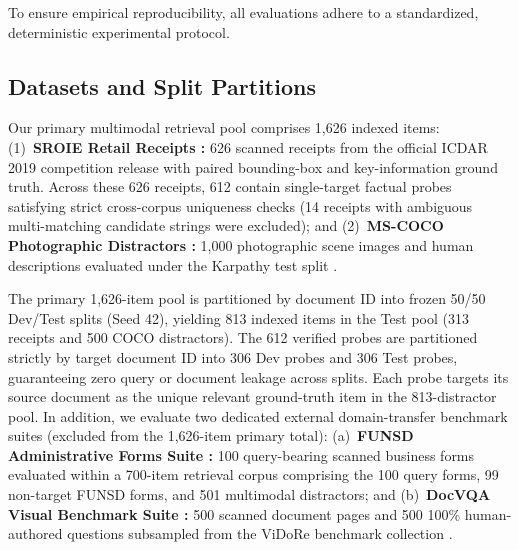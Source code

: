 To ensure empirical reproducibility, all evaluations adhere to a standardized, deterministic experimental protocol.

\subsection{Datasets and Split Partitions}
Our primary multimodal retrieval pool comprises 1,626 indexed items: (1)~\textbf{SROIE Retail Receipts \cite{huang2019sroie}:} 626 scanned receipts from the official ICDAR 2019 competition release with paired bounding-box and key-information ground truth. Across these 626 receipts, 612 contain single-target factual probes satisfying strict cross-corpus uniqueness checks (14 receipts with ambiguous multi-matching candidate strings were excluded); and (2)~\textbf{MS-COCO Photographic Distractors \cite{lin2014coco}:} 1,000 photographic scene images and human descriptions evaluated under the Karpathy test split \cite{karpathy2015deep}.

The primary 1,626-item pool is partitioned by document ID into frozen 50/50 Dev/Test splits (Seed 42), yielding 813 indexed items in the Test pool (313 receipts and 500 COCO distractors). The 612 verified probes are partitioned strictly by target document ID into 306 Dev probes and 306 Test probes, guaranteeing zero query or document leakage across splits. Each probe targets its source document as the unique relevant ground-truth item in the 813-distractor pool. In addition, we evaluate two dedicated external domain-transfer benchmark suites (excluded from the 1,626-item primary total): (a)~\textbf{FUNSD Administrative Forms Suite \cite{jaume2019funsd}:} 100 query-bearing scanned business forms evaluated within a 700-item retrieval corpus comprising the 100 query forms, 99 non-target FUNSD forms, and 501 multimodal distractors; and (b)~\textbf{DocVQA Visual Benchmark Suite \cite{mathew2021docvqa}:} 500 scanned document pages and 500 100\% human-authored questions subsampled from the ViDoRe benchmark collection \cite{faysse2024colpali}.


